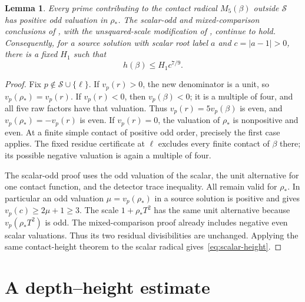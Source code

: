 \documentclass[11pt,a4paper]{article}
\newtheorem{lemma}[theorem]{Lemma}
\begin{document}
\begin{lemma}\label{lem:odd}
Every prime contributing to the contact radical $M_5(\beta)$ outside
$\mathcal S$ has positive odd valuation in $\rho_*$. The scalar-odd
and mixed-comparison conclusions of \cite[Section 3]{General}, with
the unsquared-scale modification of \cite{UnitNorm}, continue to hold.
Consequently, for a source solution with scalar root label $a$ and
$c=|a-1|>0$, there is a fixed $H_1$ such that
\begin{equation}\label{eq:scalar-height}
                         h(\beta)\le H_1c^{7/9}.
\end{equation}
\end{lemma}
\begin{proof}
Fix $p\notin\mathcal S\cup\{\ell\}$. If $v_p(r)>0$, the new
denominator is a unit, so $v_p(\rho_*)=v_p(r)$. If $v_p(r)<0$, then
$v_p(\beta)<0$; it is a multiple of four, and all five raw factors
have that valuation. Thus $v_p(r)=5v_p(\beta)$ is even, and
$v_p(\rho_*)=-v_p(r)$ is even. If $v_p(r)=0$, the valuation of
$\rho_*$ is nonpositive and even. At a finite simple contact of
positive odd order, precisely the first case applies. The fixed residue
certificate at $\ell$ excludes every finite contact of $\beta$ there;
its possible negative valuation is again a multiple of four.

The scalar-odd proof uses the odd valuation of the scalar, the unit
alternative for one contact function, and the detector trace inequality.
All remain valid for $\rho_*$. In particular an odd valuation
$\mu=v_p(\rho_*)$ in a source solution is positive and gives
$v_p(c)\ge2\mu+1\ge3$. The scale $1+\rho_*T^2$ has the same
unit alternative because $v_p(\rho_*T^2)$ is odd. The mixed-comparison
proof already includes negative even scalar valuations. Thus its two
residual divisibilities are unchanged. Applying the same contact-height
theorem to the scalar radical gives~\eqref{eq:scalar-height}.
\end{proof}

\section{A depth--height estimate}
\end{document}
